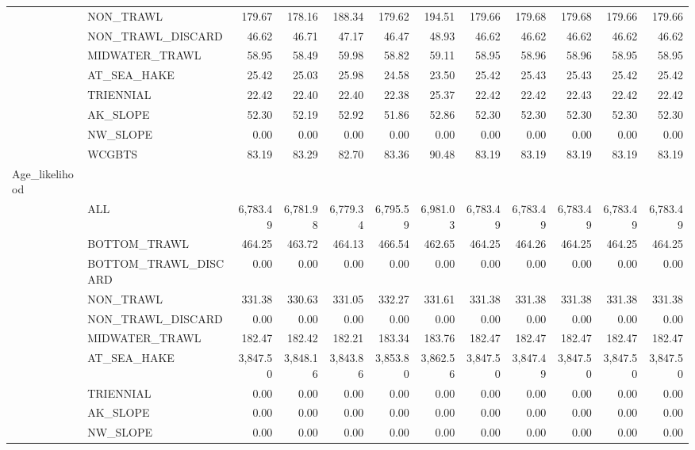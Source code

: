 \documentclass[
]{scrartcl}
\begin{document}
\begin{landscape}
\begin{longtable}{llrrrrrrrrrr}
 & NON\_TRAWL & 179.67 & 178.16 & 188.34 & 179.62 & 194.51 & 179.66 & 179.68 & 179.68 & 179.66 & 179.66 \\ 
 & NON\_TRAWL\_DISCARD & 46.62 & 46.71 & 47.17 & 46.47 & 48.93 & 46.62 & 46.62 & 46.62 & 46.62 & 46.62 \\ 
 & MIDWATER\_TRAWL & 58.95 & 58.49 & 59.98 & 58.82 & 59.11 & 58.95 & 58.96 & 58.96 & 58.95 & 58.95 \\ 
 & AT\_SEA\_HAKE & 25.42 & 25.03 & 25.98 & 24.58 & 23.50 & 25.42 & 25.43 & 25.43 & 25.42 & 25.42 \\ 
 & TRIENNIAL & 22.42 & 22.40 & 22.40 & 22.38 & 25.37 & 22.42 & 22.42 & 22.43 & 22.42 & 22.42 \\ 
 & AK\_SLOPE & 52.30 & 52.19 & 52.92 & 51.86 & 52.86 & 52.30 & 52.30 & 52.30 & 52.30 & 52.30 \\ 
 & NW\_SLOPE & 0.00 & 0.00 & 0.00 & 0.00 & 0.00 & 0.00 & 0.00 & 0.00 & 0.00 & 0.00 \\ 
 & WCGBTS & 83.19 & 83.29 & 82.70 & 83.36 & 90.48 & 83.19 & 83.19 & 83.19 & 83.19 & 83.19 \\ 
Age\_likelihood &  &  &  &  &  &  &  &  &  &  &  \\ 
 & ALL & 6,783.49 & 6,781.98 & 6,779.34 & 6,795.59 & 6,981.03 & 6,783.49 & 6,783.49 & 6,783.49 & 6,783.49 & 6,783.49 \\ 
 & BOTTOM\_TRAWL & 464.25 & 463.72 & 464.13 & 466.54 & 462.65 & 464.25 & 464.26 & 464.25 & 464.25 & 464.25 \\ 
 & BOTTOM\_TRAWL\_DISCARD & 0.00 & 0.00 & 0.00 & 0.00 & 0.00 & 0.00 & 0.00 & 0.00 & 0.00 & 0.00 \\ 
 & NON\_TRAWL & 331.38 & 330.63 & 331.05 & 332.27 & 331.61 & 331.38 & 331.38 & 331.38 & 331.38 & 331.38 \\ 
 & NON\_TRAWL\_DISCARD & 0.00 & 0.00 & 0.00 & 0.00 & 0.00 & 0.00 & 0.00 & 0.00 & 0.00 & 0.00 \\ 
 & MIDWATER\_TRAWL & 182.47 & 182.42 & 182.21 & 183.34 & 183.76 & 182.47 & 182.47 & 182.47 & 182.47 & 182.47 \\ 
 & AT\_SEA\_HAKE & 3,847.50 & 3,848.16 & 3,843.86 & 3,853.80 & 3,862.56 & 3,847.50 & 3,847.49 & 3,847.50 & 3,847.50 & 3,847.50 \\ 
 & TRIENNIAL & 0.00 & 0.00 & 0.00 & 0.00 & 0.00 & 0.00 & 0.00 & 0.00 & 0.00 & 0.00 \\ 
 & AK\_SLOPE & 0.00 & 0.00 & 0.00 & 0.00 & 0.00 & 0.00 & 0.00 & 0.00 & 0.00 & 0.00 \\ 
 & NW\_SLOPE & 0.00 & 0.00 & 0.00 & 0.00 & 0.00 & 0.00 & 0.00 & 0.00 & 0.00 & 0.00 \\ 

\end{longtable}
\end{landscape}
\end{document}
